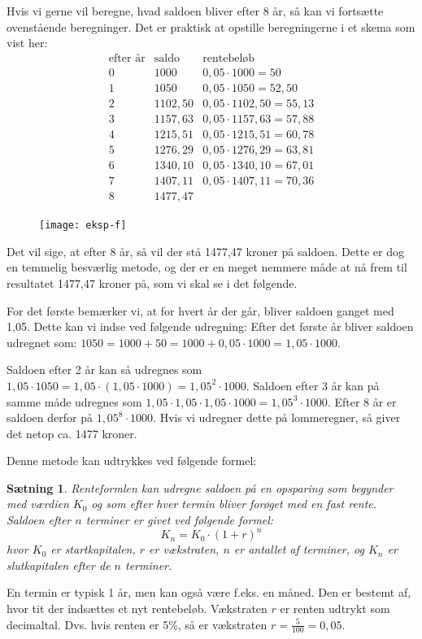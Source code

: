 \documentclass[12pt,oneside,a4paper]{article}
\theoremstyle{plain}
\newtheorem*{thm}{Sætning}
\begin{document}
Hvis vi gerne vil beregne, hvad saldoen bliver efter 8 år, så kan vi fortsætte
ovenstående beregninger. Det er praktisk at opstille beregningerne i et skema
som vist her:
$$
\begin{array}{r|c|l}
    \mbox{efter år} & \mbox{saldo} & \mbox{rentebeløb} \\
    \hline
0 & 1000 & 0,05\cdot 1000 = 50 \\
    \hline
1 & 1050 & 0,05\cdot 1050 = 52,50 \\
    \hline
2 & 1102,50 & 0,05\cdot 1102,50 = 55,13 \\
    \hline
3 & 1157,63 & 0,05\cdot 1157,63 = 57,88 \\
    \hline
4 & 1215,51 & 0,05\cdot 1215,51 = 60,78 \\
    \hline
5 & 1276,29 & 0,05\cdot 1276,29 = 63,81 \\
    \hline
6 & 1340,10 & 0,05\cdot 1340,10 = 67,01 \\
    \hline
7 & 1407,11 & 0,05\cdot 1407,11 = 70,36 \\
    \hline
8 & 1477,47 & 
\end{array}
$$
\begin{figure}[ht]
    \centering
    \texttt{[image: eksp-f]}
    \label{eksp-f}
\end{figure}
Det vil sige, at efter 8 år, så vil der stå 1477,47 kroner på saldoen.  Dette
er dog en temmelig besværlig metode, og der er en meget nemmere måde at nå frem
til resultatet 1477,47 kroner på, som vi skal se i det følgende.

For det første bemærker vi, at for hvert år der går, bliver saldoen ganget med
1,05. Dette kan vi indse ved følgende udregning: Efter det første år bliver
saldoen udregnet som: $1050 = 1000 + 50 = 1000 + 0,05\cdot 1000 = 1,05 \cdot
1000$.

Saldoen efter 2 år kan så udregnes som $1,05\cdot 1050 = 1,05 \cdot (1,05 \cdot
1000) = 1,05^2 \cdot 1000$. Saldoen efter 3 år kan på samme måde udregnes som
$1,05\cdot1,05\cdot1,05\cdot 1000 = 1,05^3 \cdot 1000$. Efter 8 år er saldoen
derfor på $1,05^8\cdot 1000$. Hvis vi udregner dette på lommeregner, så giver
det netop ca. 1477 kroner.

Denne metode kan udtrykkes ved følgende formel:
\begin{thm}
    {\em Renteformlen} kan udregne saldoen på en opsparing som begynder med
    værdien $K_0$ og som efter hver {\em termin} bliver forøget med en fast
    rente. Saldoen efter $n$ terminer er givet ved følgende formel:
    $$
    K_n = K_0 \cdot (1+r)^n
    $$
    hvor $K_0$ er {\em startkapitalen}, $r$ er {\em vækstraten}, $n$ er antallet af
    terminer, og $K_n$ er {\em slutkapitalen} efter de $n$ terminer.
\end{thm}
En termin er typisk 1 år, men kan også være f.eks. en måned. Den er bestemt af,
hvor tit der indsættes et nyt rentebeløb. Vækstraten $r$ er renten udtrykt som
decimaltal. Dvs. hvis renten er 5\%, så er vækstraten $r=\frac{5}{100}=0,05$.
\end{document}
